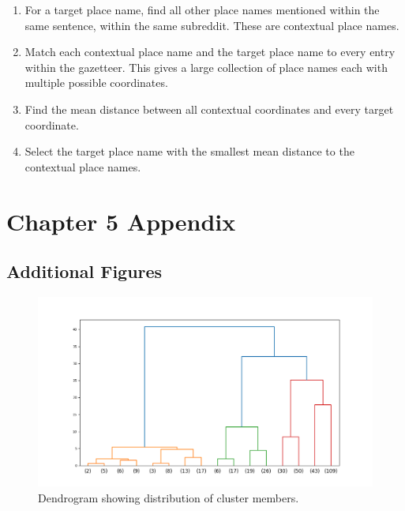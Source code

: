 \documentclass[
  letterpaper,
  11pt,
  english,
  onehalfspacing,
  headsepline]{MastersDoctoralThesis}
\providecommand{\tightlist}{%
  \setlength{\itemsep}{0pt}\setlength{\parskip}{0pt}}\usepackage{longtable,booktabs,array}
\begin{document}
\begin{enumerate}
\def\labelenumi{\arabic{enumi}.}
\tightlist
\item
  For a target place name, find all other place names mentioned within
  the same sentence, within the same subreddit. These are contextual
  place names.
\item
  Match each contextual place name and the target place name to every
  entry within the gazetteer. This gives a large collection of place
  names each with multiple possible coordinates.
\item
  Find the mean distance between all contextual coordinates and every
  target coordinate.
\item
  Select the target place name with the smallest mean distance to the
  contextual place names.
\end{enumerate}

\hypertarget{chapter-5-appendix}{%
\chapter{Chapter 5 Appendix}\label{chapter-5-appendix}}

\hypertarget{additional-figures-1}{%
\section{Additional Figures}\label{additional-figures-1}}

\begin{figure}

{\centering \includegraphics{appendices/appendices_figures/clusters_d.png}

}

\caption{\label{fig-dendrogram}Dendrogram showing distribution of
cluster members.}

\end{figure}
\end{document}
